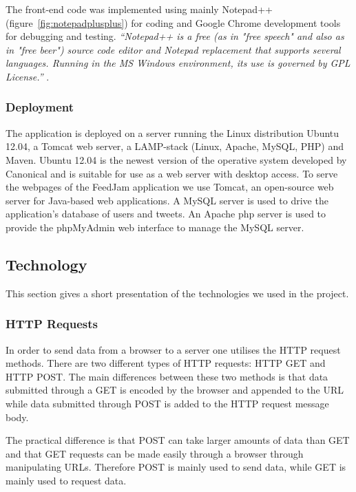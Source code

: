 The front-end code was implemented using mainly Notepad++ (figure~\ref{fig:notepadplusplus}) for coding and Google Chrome development tools for debugging and testing. \textit{``Notepad++ is a free (as in "free speech" and also as in "free beer") source code editor and Notepad replacement that supports several languages. Running in the MS Windows environment, its use is governed by GPL License.''} \cite{Ho2012}.

\subsubsection{Deployment}

The application is deployed on a server running the Linux distribution Ubuntu 12.04, a Tomcat web server, a LAMP-stack (Linux, Apache, MySQL, PHP) and Maven. Ubuntu 12.04 is the newest version of the operative system developed by Canonical and is suitable for use as a web server with desktop access. To serve the webpages of the FeedJam application we use Tomcat, an open-source web server for Java-based web applications. A MySQL server is used to drive the application's database of users and tweets. An Apache php server is used to provide the phpMyAdmin web interface to manage the MySQL server.

\subsection{Technology}
This section gives a short presentation of the technologies we used in the project. 

\subsubsection{HTTP Requests}
In order to send data from a browser to a server one utilises the HTTP request methods. There are two different types of HTTP requests: HTTP GET and HTTP POST. The main differences between these two methods is that data submitted through a GET is encoded by the browser and appended to the URL while data submitted through POST is added to the HTTP request message body.

The practical difference is that POST can take larger amounts of data than GET and that GET requests can be made easily through a browser through manipulating URLs. Therefore POST is mainly used to send data, while GET is mainly used to request data.

